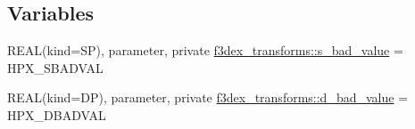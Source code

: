 \subsection*{Variables}
\begin{DoxyCompactItemize}
\item 
REAL(kind=SP), parameter, private \hyperlink{namespacef3dex__transforms_a2fbf86c61b3f102ffaa43870e3523f02}{f3dex\_\-transforms::s\_\-bad\_\-value} = HPX\_\-SBADVAL
\item 
REAL(kind=DP), parameter, private \hyperlink{namespacef3dex__transforms_a179e0089cbbd29b50ea12d1a8298b99a}{f3dex\_\-transforms::d\_\-bad\_\-value} = HPX\_\-DBADVAL
\end{DoxyCompactItemize}
